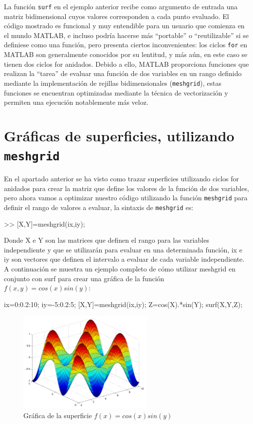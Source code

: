La función \texttt{surf} en el ejemplo anterior recibe como argumento de
entrada una matriz bidimensional cuyos valores corresponden a cada punto
evaluado. El código mostrado es funcional y muy entendible para un
usuario que comienza en el mundo MATLAB, e incluso podría hacerse más
``portable'' o ``reutilizable'' si se definiese como una función, pero
presenta ciertos inconvenientes: los ciclos \texttt{for} en MATLAB son
generalmente conocidos por su lentitud, y más aún, en este caso se
tienen dos ciclos for anidados. Debido a ello, MATLAB proporciona
funciones que realizan la ``tarea'' de evaluar una función de dos
variables en un rango definido mediante la implementación de rejillas
bidimensionales (\texttt{meshgrid}), estas funciones se encuentran
optimizadas mediante la técnica de vectorización y permiten una
ejecución notablemente más veloz.

\section{Gráficas de superficies, utilizando \texttt{meshgrid}}

En el apartado anterior se ha visto como trazar superficies utilizando
ciclos for anidados para crear la matriz que define los valores de la
función de dos variables, pero ahora vamos a optimizar nuestro código
utilizando la función \texttt{meshgrid} para definir el rango de valores
a evaluar, la sintaxis de \texttt{meshgrid} es:

\begin{matlab}
>> [X,Y]=meshgrid(ix,iy);
\end{matlab}

Donde X e Y son las matrices que definen el rango para las variables
independiente y que se utilizarán para evaluar en una determinada
función, ix e iy son vectores que definen el intervalo a evaluar de cada
variable independiente. A continuación se muestra un ejemplo completo de
cómo utilizar meshgrid en conjunto con surf para crear una gráfica de la
función  $f(x,y)=cos(x) sin(y)$:

\begin{matlab}
ix=0:0.2:10;
iy=-5:0.2:5;
[X,Y]=meshgrid(ix,iy);
Z=cos(X).*sin(Y);
surf(X,Y,Z);
\end{matlab}

\begin{figure}[htbp]
    \centering
    \includegraphics[width=0.6\textwidth]{src/img/ch4/img_4_8.png}
    \caption{Gráfica de la superficie $f(x)=cos(x) sin(y)$}
    \label{fig:img_4_8}
\end{figure}

